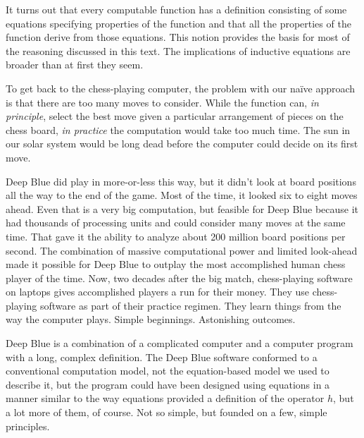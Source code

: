 It turns out that every computable function has a definition consisting
of some equations specifying properties of the function
and that all the properties of the function derive
from those equations.
This notion provides the basis for most of the reasoning
discussed in this text.
The implications of inductive equations 
are broader than at first they seem.

To get back to the chess-playing computer, the problem with our
na\"ive approach is that there are too many moves to consider.
While the function can, \emph{in principle},
select the best move given a particular arrangement of pieces on the chess board,
\emph{in practice} the computation
would take too much time.
The sun in our solar system would be long dead
before the computer could decide on its first move.

Deep Blue
did play in more-or-less this way, but it didn't look at board positions
all the way to the end of the game. Most of the time, it looked
six to eight moves ahead. Even that is a very big computation,
but feasible for Deep Blue because it had
thousands of processing units and could consider many moves at the same time.
That gave it the ability to analyze about 200 million board positions per second.
The combination of massive computational power and limited look-ahead
made it possible for Deep Blue to outplay
the most accomplished human chess player of the time.
Now, two decades after the big match,
chess-playing software on laptops
gives accomplished players a run for their money.
They use chess-playing software as part of their
practice regimen. They learn things from the way
the computer plays. Simple beginnings.
Astonishing outcomes.

Deep Blue is a combination of a complicated computer
and a computer program with a long, complex definition.
The Deep Blue software conformed to a conventional computation model,
not the equation-based model we used to describe it,
but the program could have been designed
using equations in a manner similar to the
way equations provided a definition of the operator $h$,
but a lot more of them, of course.
Not so simple, but founded on a few, simple principles.

